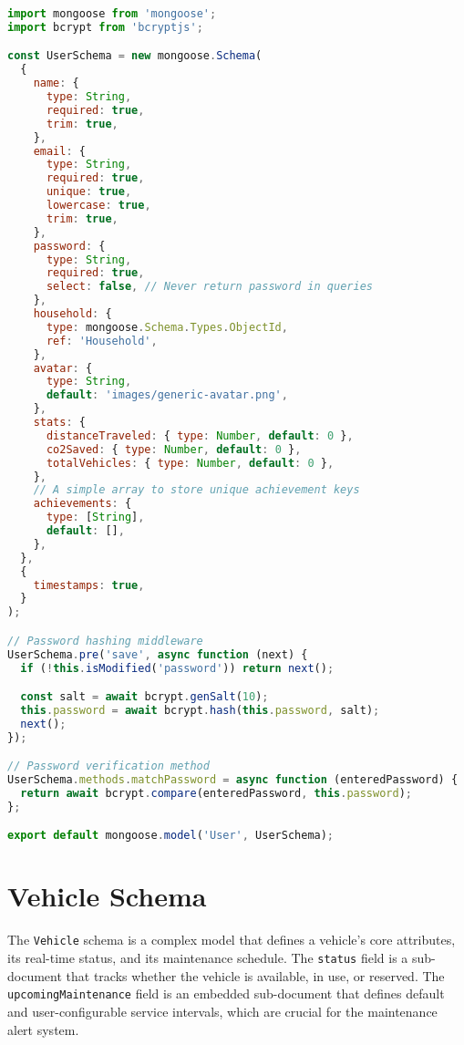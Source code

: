 \begin{lstlisting}[language=JavaScript, caption={Source code for \texttt{models/User.js}}, breaklines=true]
import mongoose from 'mongoose';
import bcrypt from 'bcryptjs';

const UserSchema = new mongoose.Schema(
  {
    name: {
      type: String,
      required: true,
      trim: true,
    },
    email: {
      type: String,
      required: true,
      unique: true,
      lowercase: true,
      trim: true,
    },
    password: {
      type: String,
      required: true,
      select: false, // Never return password in queries
    },
    household: {
      type: mongoose.Schema.Types.ObjectId,
      ref: 'Household',
    },
    avatar: {
      type: String,
      default: 'images/generic-avatar.png',
    },
    stats: {
      distanceTraveled: { type: Number, default: 0 },
      co2Saved: { type: Number, default: 0 },
      totalVehicles: { type: Number, default: 0 },
    },
    // A simple array to store unique achievement keys
    achievements: {
      type: [String],
      default: [],
    },
  },
  {
    timestamps: true,
  }
);

// Password hashing middleware
UserSchema.pre('save', async function (next) {
  if (!this.isModified('password')) return next();

  const salt = await bcrypt.genSalt(10);
  this.password = await bcrypt.hash(this.password, salt);
  next();
});

// Password verification method
UserSchema.methods.matchPassword = async function (enteredPassword) {
  return await bcrypt.compare(enteredPassword, this.password);
};

export default mongoose.model('User', UserSchema);
\end{lstlisting}

\section{Vehicle Schema}
The \texttt{Vehicle} schema is a complex model that defines a vehicle's core attributes, its real-time status, and its maintenance schedule. The \texttt{status} field is a sub-document that tracks whether the vehicle is available, in use, or reserved. The \texttt{upcomingMaintenance} field is an embedded sub-document that defines default and user-configurable service intervals, which are crucial for the maintenance alert system.

